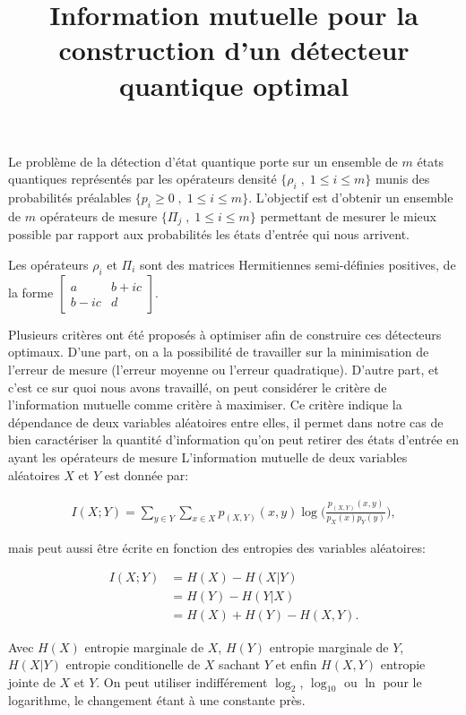 \documentclass[12pt,a4paper]{article}
\title{Information mutuelle pour la construction d'un détecteur quantique optimal}
\date{}
\begin{document}
    \maketitle

    Le problème de la détection d'état quantique porte sur un ensemble de $m$ états quantiques représentés par les opérateurs densité $\{\rho_i \; , \; 1 \leq i \leq m\}$ munis des probabilités préalables $\{p_i \geq 0 \; , \; 1 \leq i \leq m \}$. L'objectif est d'obtenir un ensemble de $m$ opérateurs de mesure $\{\Pi_j \; , \; 1 \leq i \leq m\}$ permettant de mesurer le mieux possible par rapport aux probabilités les états d'entrée qui nous arrivent.

    Les opérateurs $\rho_i$ et $\Pi_i$ sont des matrices Hermitiennes semi-définies positives, de la forme $\begin{bmatrix}a & b+ic \\ b-ic & d \end{bmatrix}$.


    Plusieurs critères ont été proposés à optimiser afin de construire ces détecteurs optimaux. D'une part, on a la possibilité de travailler sur la minimisation de l'erreur de mesure (l'erreur moyenne ou l'erreur quadratique). D'autre part, et c'est ce sur quoi nous avons travaillé, on peut considérer le critère de l'information mutuelle comme critère à maximiser. Ce critère indique la dépendance de deux variables aléatoires entre elles, il permet dans notre cas de bien caractériser la quantité d'information qu'on peut retirer des états d'entrée en ayant les opérateurs de mesure
\medbreak
    L'information mutuelle de deux variables aléatoires $X$ et $Y$ est donnée par:

    \begin{align}
        I(X;Y) = \displaystyle \sum_{y \in Y} \displaystyle \sum_{x \in X} p_{(X, Y)}(x, y) \log \big(\frac{p_{(X, Y)}(x, y)}{p_X(x) p_Y(y)}\big),
    \end{align}

    mais peut aussi être écrite en fonction des entropies des variables aléatoires:

    \begin{align}
        I(X; Y) &= H(X) - H(X | Y) \\
                &= H(Y) - H(Y | X) \\
                &= H(X) + H(Y) - H(X, Y).
    \end{align}

    Avec $H(X)$ entropie marginale de $X$, $H(Y)$ entropie marginale de $Y$, $H(X|Y)$ entropie conditionelle de $X$ sachant $Y$ et enfin $H(X, Y)$ entropie jointe de $X$ et $Y$. On peut utiliser indifférement $\log_2$, $\log_{10}$ ou $\ln$ pour le logarithme, le changement étant à une constante près.
\end{document}
